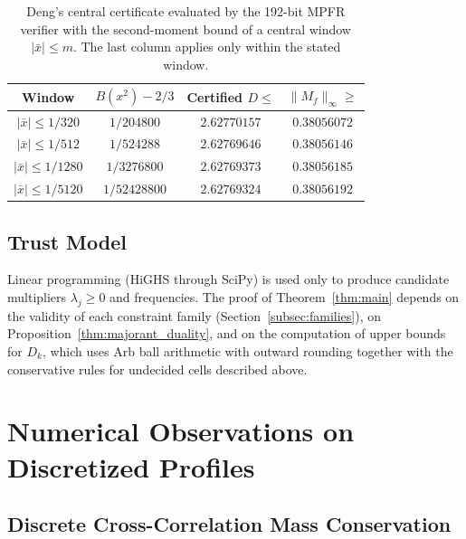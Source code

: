 \documentclass[11pt,a4paper]{article}
\theoremstyle{definition}
\theoremstyle{remark}
\begin{document}
\begin{table}[h]
\centering
\small
\begin{tabular}{cccc}
\toprule
\textbf{Window} & \textbf{$B(x^2) - 2/3$} & \textbf{Certified $D \le$} & \textbf{$\|M_f\|_\infty \ge$} \\
\midrule
$|\bar{x}| \le 1/320$ & $1/204800$ & $2.62770157$ & $0.38056072$ \\
$|\bar{x}| \le 1/512$ & $1/524288$ & $2.62769646$ & $0.38056146$ \\
$|\bar{x}| \le 1/1280$ & $1/3276800$ & $2.62769373$ & $0.38056185$ \\
$|\bar{x}| \le 1/5120$ & $1/52428800$ & $2.62769324$ & $0.38056192$ \\
\bottomrule
\end{tabular}
\caption{Deng's central certificate evaluated by the 192-bit MPFR verifier with the second-moment bound of a central window $|\bar{x}| \le m$. The last column applies only within the stated window.}
\label{tab:window}
\end{table}

\subsection{Trust Model}

Linear programming (HiGHS through SciPy) is used only to produce candidate multipliers $\lambda_j \ge 0$ and frequencies. The proof of Theorem~\ref{thm:main} depends on the validity of each constraint family (Section~\ref{subsec:families}), on Proposition~\ref{thm:majorant_duality}, and on the computation of upper bounds for $D_k$, which uses Arb ball arithmetic with outward rounding together with the conservative rules for undecided cells described above.

\section{Numerical Observations on Discretized Profiles}

\subsection{Discrete Cross-Correlation Mass Conservation}
\end{document}
